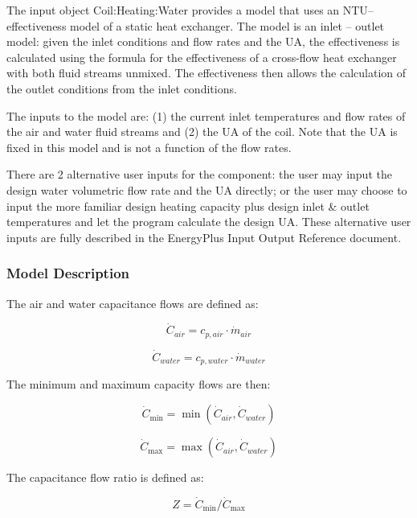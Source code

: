 The input object Coil:Heating:Water provides a model that uses an NTU--effectiveness model of a static heat exchanger. The model is an inlet -- outlet model: given the inlet conditions and flow rates and the UA, the effectiveness is calculated using the formula for the effectiveness of a cross-flow heat exchanger with both fluid streams unmixed. The effectiveness then allows the calculation of the outlet conditions from the inlet conditions.

The inputs to the model are: (1) the current inlet temperatures and flow rates of the air and water fluid streams and (2) the UA of the coil. Note that the UA is fixed in this model and is not a function of the flow rates.

There are 2 alternative user inputs for the component: the user may input the design water volumetric flow rate and the UA directly; or the user may choose to input the more familiar design heating capacity plus design inlet \& outlet temperatures and let the program calculate the design UA. These alternative user inputs are fully described in the EnergyPlus Input Output Reference document.

\subsubsection{Model Description}\label{model-description-1-004}

The air and water capacitance flows are defined as:

\begin{equation}
{\dot C_{air}} = {c_{p,air}}\cdot {\dot m_{air}}
\end{equation}

\begin{equation}
{\dot C_{water}} = {c_{p,water}}\cdot {\dot m_{water}}
\end{equation}

The minimum and maximum capacity flows are then:

\begin{equation}
{\dot C_{\min }} = \min ({\dot C_{air}},{\dot C_{water}})
\end{equation}

\begin{equation}
{\dot C_{\max }} = \max ({\dot C_{air}},{\dot C_{water}})
\end{equation}

The capacitance flow ratio is defined as:

\begin{equation}
Z = {\dot C_{\min }}/{\dot C_{\max }}
\end{equation}

